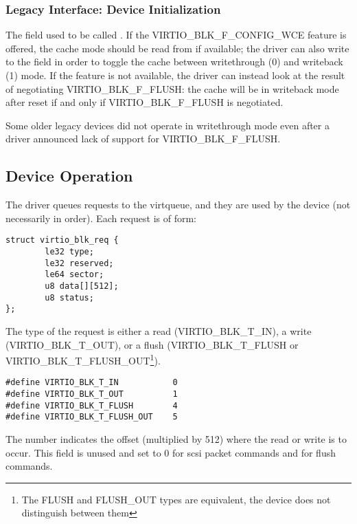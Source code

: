 \subsubsection{Legacy Interface: Device Initialization}\label{sec:Device Types / Block Device / Device Initialization / Legacy Interface: Device Initialization}

The  field used to be called .  If the
VIRTIO_BLK_F_CONFIG_WCE feature is offered, the cache mode should be
read from  if available; the
driver can also write to the field in order to toggle the cache
between writethrough (0) and writeback (1) mode.  If the feature is
not available, the driver can instead look at the result of
negotiating VIRTIO_BLK_F_FLUSH: the cache will be in writeback mode
after reset if and only if VIRTIO_BLK_F_FLUSH is negotiated.

Some older legacy devices did not operate in writethrough mode even
after a driver announced lack of support for VIRTIO_BLK_F_FLUSH.

\subsection{Device Operation}\label{sec:Device Types / Block Device / Device Operation}

The driver queues requests to the virtqueue, and they are used by
the device (not necessarily in order). Each request is of form:

\begin{lstlisting}
struct virtio_blk_req {
        le32 type;
        le32 reserved;
        le64 sector;
        u8 data[][512];
        u8 status;
};
\end{lstlisting}

The type of the request is either a read (VIRTIO_BLK_T_IN), a write
(VIRTIO_BLK_T_OUT), or a flush (VIRTIO_BLK_T_FLUSH or
VIRTIO_BLK_T_FLUSH_OUT\footnote{The FLUSH and FLUSH_OUT types are equivalent, the device does not
distinguish between them
}).

\begin{lstlisting}
#define VIRTIO_BLK_T_IN           0
#define VIRTIO_BLK_T_OUT          1
#define VIRTIO_BLK_T_FLUSH        4
#define VIRTIO_BLK_T_FLUSH_OUT    5
\end{lstlisting}

The  number indicates the offset (multiplied by 512) where
the read or write is to occur. This field is unused and set to 0
for scsi packet commands and for flush commands.

